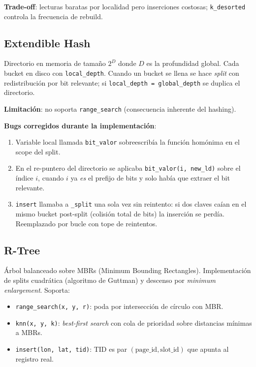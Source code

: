 \documentclass[11pt,a4paper]{article}
\begin{document}
\textbf{Trade-off}: lecturas baratas por localidad pero inserciones
costosas; \texttt{k\_desorted} controla la frecuencia de rebuild.

\subsection{Extendible Hash}
Directorio en memoria de tamaño $2^{D}$ donde $D$ es la profundidad
global. Cada bucket en disco con \texttt{local\_depth}. Cuando un bucket
se llena se hace \emph{split} con redistribución por bit relevante; si
\texttt{local\_depth = global\_depth} se duplica el directorio.

\textbf{Limitación}: no soporta \texttt{range\_search} (consecuencia
inherente del hashing).

\textbf{Bugs corregidos durante la implementación}:
\begin{enumerate}[nosep]
    \item Variable local llamada \texttt{bit\_valor} sobreescribía la función homónima en el scope del split.
    \item En el re-puntero del directorio se aplicaba \texttt{bit\_valor(i, new\_ld)} sobre el índice $i$, cuando $i$ ya \emph{es} el prefijo de bits y solo había que extraer el bit relevante.
    \item \texttt{insert} llamaba a \texttt{\_split} una sola vez sin reintento: si dos claves caían en el mismo bucket post-split (colisión total de bits) la inserción se perdía. Reemplazado por bucle con tope de reintentos.
\end{enumerate}

\subsection{R-Tree}
Árbol balanceado sobre MBRs (Minimum Bounding Rectangles).
Implementación de splits cuadrática (algoritmo de Guttman) y descenso por
\emph{minimum enlargement}. Soporta:
\begin{itemize}[nosep]
    \item \texttt{range\_search(x, y, r)}: poda por intersección de
    círculo con MBR.
    \item \texttt{knn(x, y, k)}: \emph{best-first search} con cola de
    prioridad sobre distancias mínimas a MBRs.
    \item \texttt{insert(lon, lat, tid)}: TID es par
    $(\text{page\_id}, \text{slot\_id})$ que apunta al registro real.
\end{itemize}
\end{document}

